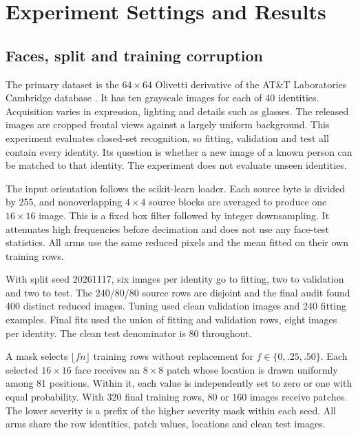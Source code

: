 \section{Experiment Settings and Results}
\subsection{Faces, split and training corruption}

The primary dataset is the $64\times64$ Olivetti derivative of the AT\&T Laboratories Cambridge database \citep{attcam,sklearnfaces}. It has ten grayscale images for each of 40 identities. Acquisition varies in expression, lighting and details such as glasses. The released images are cropped frontal views against a largely uniform background. This experiment evaluates closed-set recognition, so fitting, validation and test all contain every identity. Its question is whether a new image of a known person can be matched to that identity. The experiment does not evaluate unseen identities.

The input orientation follows the scikit-learn loader. Each source byte is divided by 255, and nonoverlapping $4\times4$ source blocks are averaged to produce one $16\times16$ image. This is a fixed box filter followed by integer downsampling. It attenuates high frequencies before decimation and does not use any face-test statistics. All arms use the same reduced pixels and the mean fitted on their own training rows.


With split seed 20261117, six images per identity go to fitting, two to validation and two to test. The 240/80/80 source rows are disjoint and the final audit found 400 distinct reduced images. Tuning used clean validation images and 240 fitting examples. Final fits used the union of fitting and validation rows, eight images per identity. The clean test denominator is 80 throughout.

A mask selects $\lfloor fn\rfloor$ training rows without replacement for $f\in\{0,.25,.50\}$. Each selected $16\times16$ face receives an $8\times8$ patch whose location is drawn uniformly among 81 positions. Within it, each value is independently set to zero or one with equal probability. With 320 final training rows, 80 or 160 images receive patches. The lower severity is a prefix of the higher severity mask within each seed. All arms share the row identities, patch values, locations and clean test images.

